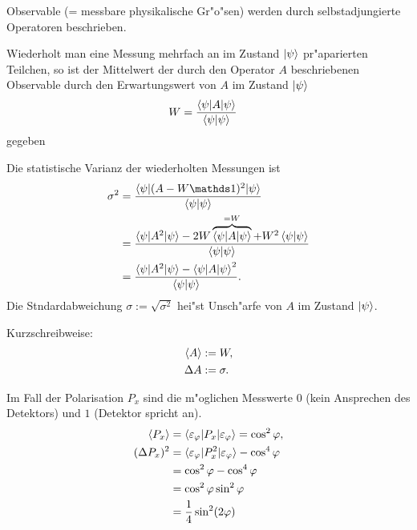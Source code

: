 \documentclass[a4paper]{scrartcl}
\begin{document}
{\begin{iaufz}
\item Observable (= messbare physikalische Gr"o"sen) werden durch selbstadjungierte Operatoren beschrieben.
\item Wiederholt man eine Messung mehrfach an im Zustand $\ket \psi$ pr"aparierten Teilchen, so ist der Mittelwert der durch den Operator $A$ beschriebenen Observable durch den Erwartungswert von $A$ im Zustand $\ket \psi$
\begin{align}
W & = \frac{ \braket{ \psi | A | \psi }}{ \braket { \psi | \psi }}
\end{align}
gegeben
\item Die statistische Varianz der wiederholten Messungen ist
\begin{align}
\begin{split}
\sigma^2 & = 
\frac{ 
\braket{ \psi | (A - W \dOne)^2 | \psi }}
{ \braket{ \psi | \psi }} \\
& = 
\frac{ 
\braket{ \psi | A^2 | \psi} - 2 W \overbrace{ \braket{ \psi | A | \psi }}^{=W} + W^2 \braket{ \psi | \psi}}{\braket{ \psi | \psi}} \\
& = \frac{ \braket{ \psi | A^2 | \psi } - \braket{ \psi | A | \psi }^2}{\braket{ \psi | \psi }}.
\end{split}
\end{align}
Die Stndardabweichung $\sigma := \sqrt {\sigma^2}$ hei"st Unsch"arfe von $A$ im Zustand $\ket \psi$.

Kurzschreibweise:
\begin{align}
\begin{split}
\braket A & := W, \\
\Delta A & := \sigma.
\end{split}
\end{align}
\end{iaufz}
Im Fall der Polarisation $P_x$ sind die m"oglichen Messwerte $0$ (kein Ansprechen des Detektors) und $1$ (Detektor spricht an).
\begin{align}
\braket {P_x} & = \braket { \varepsilon_\varphi | P_x | \varepsilon_\varphi } = \cos^2 \varphi, \\
(\Delta P_x )^2 & = \braket { \varepsilon_\varphi | P_x^2 | \varepsilon_\varphi } - \cos^4 \varphi \notag \\
& = \cos^2 \varphi - \cos^4 \varphi \notag \\
& = \cos^2 \varphi \sin^2 \varphi \notag \\
& = \frac14 \sin^2(2 \varphi)
\end{align}

}
\end{document}
